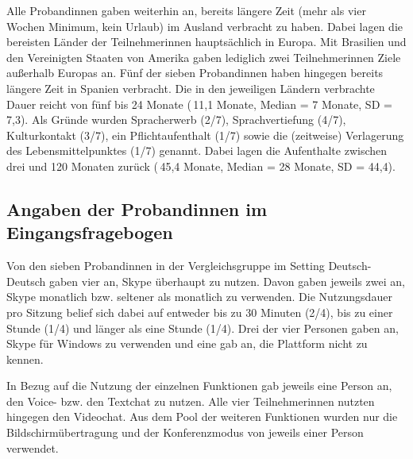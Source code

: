 
Alle Proband{\textperiodcentered}innen gaben weiterhin an, bereits längere Zeit (mehr als vier Wochen Minimum, kein Urlaub) im Ausland verbracht zu haben. Dabei lagen die bereisten Länder der Teilnehmer{\textperiodcentered}innen hauptsächlich in Europa. Mit Brasilien und den Vereinigten Staaten von Amerika gaben lediglich zwei Teilnehmer{\textperiodcentered}innen Ziele außerhalb Europas an. Fünf der sieben Proband{\textperiodcentered}innen haben hingegen bereits längere Zeit in Spanien verbracht. Die in den jeweiligen Ländern verbrachte Dauer reicht von fünf bis 24 Monate (\diameter\,11,1 Monate, Median = 7 Monate, SD = 7,3). Als Gründe wurden Spracherwerb (2/7), Sprachvertiefung (4/7), Kulturkontakt (3/7), ein Pflichtaufenthalt (1/7) sowie die (zeitweise) Verlagerung des Lebensmittelpunktes (1/7) genannt. Dabei lagen die Aufenthalte zwischen drei und 120 Monaten zurück (\diameter\,45,4 Monate, Median = 28 Monate, SD = 44,4).


\subsection{Angaben der Proband{\textperiodcentered}innen im Eingangsfragebogen}
\label{K6:subsec:Angaben-Eingang-Probandinnen-DeDe}


\begin{sloppypar}
Von den sieben Proband{\textperiodcentered}innen in der Vergleichsgruppe im Setting Deutsch-Deutsch gaben vier an, Skype überhaupt zu nutzen. Davon gaben jeweils zwei an, Skype monatlich bzw. seltener als monatlich zu verwenden. Die Nutzungsdauer pro Sitzung belief sich dabei auf entweder bis zu 30 Minuten (2/4), bis zu einer Stunde (1/4) und länger als eine Stunde (1/4). Drei der vier Personen gaben an, Skype für Windows zu verwenden und eine gab an, die Plattform nicht zu kennen.
\end{sloppypar}

In Bezug auf die Nutzung der einzelnen Funktionen gab jeweils eine Person an, den Voice- bzw. den Textchat zu nutzen. Alle vier Teilnehmer{\textperiodcentered}innen nutzten hingegen den Videochat. Aus dem Pool der weiteren Funktionen wurden nur die Bildschirmübertragung und der Konferenzmodus von jeweils einer Person verwendet.

